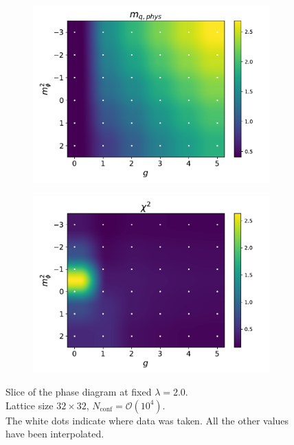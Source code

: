 \begin{figure}[htp]
\begin{subfigure}[b]{0.47\textwidth}
        \includegraphics[width=\textwidth]{figures/phase_diagram/g-m/phase_diagram_mqphys.pdf}
    \end{subfigure}
    \begin{subfigure}[b]{0.47\textwidth}
        \includegraphics[width=\textwidth]{figures/phase_diagram/g-m/phase_diagram_chi2.pdf}
    \end{subfigure}
    \caption[Phase diagram in the $g-m_\phi^2$ plane]{Slice of the phase diagram at fixed $\lambda = 2.0$. \\ Lattice size $32 \times 32$, $N_\text{conf} = \mathcal{O}(10^4)$.\\ The white dots indicate where data was taken. All the other values have been interpolated.}
    \label{fig:phase_diagram_g_m}
\end{figure}\\

